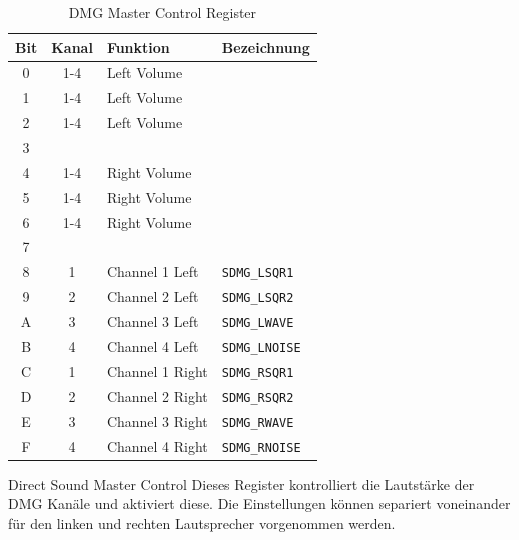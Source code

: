 \documentclass[11pt,a4paper]{scrartcl}
\begin{document}
\begin{table}[h]
	\centering
    \begin{tabular}{ c | c | p{10cm} | l } 
	    \textbf{Bit} & \textbf{Kanal} & \textbf{Funktion} & \textbf{Bezeichnung} \\
	    \hline
	    0 & 1-4 & Left Volume & \\
	    \hline
	    1 & 1-4 & Left Volume & \\
	    \hline
	    2 & 1-4 & Left Volume & \\
	    \hline
	    3 & & & \\
	    \hline
	    4 & 1-4 & Right Volume & \\
	    \hline
	    5 & 1-4 & Right Volume & \\
	    \hline
	    6 & 1-4 & Right Volume & \\
	    \hline
	    7 & & & \\
	    \hline
	    8 & 1 & Channel 1 Left & \verb|SDMG_LSQR1| \\
	    \hline
	    9 & 2 & Channel 2 Left & \verb|SDMG_LSQR2| \\
	    \hline
	    A & 3 & Channel 3 Left & \verb|SDMG_LWAVE| \\
	    \hline
	    B & 4 & Channel 4 Left & \verb|SDMG_LNOISE| \\
	    \hline
	    C & 1 & Channel 1 Right & \verb|SDMG_RSQR1| \\
	    \hline
	    D & 2 & Channel 2 Right & \verb|SDMG_RSQR2| \\
	    \hline
	    E & 3 & Channel 3 Right & \verb|SDMG_RWAVE| \\
	    \hline
	    F & 4 & Channel 4 Right & \verb|SDMG_RNOISE| \\
	\end{tabular}
	\caption{DMG Master Control Register}
	\label{table:DmgMasterControlRegister}
\end{table}

\newpage

\vspace{5mm}
\large Direct Sound Master Control \label{directsoundmastercontrol}
\vspace{2mm}\newline
Dieses Register kontrolliert die Lautst\"arke der DMG Kan\"ale und aktiviert diese. Die Einstellungen k\"onnen separiert voneinander f\"ur den linken und rechten Lautsprecher vorgenommen werden.
\end{document}
